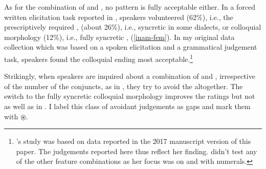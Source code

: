 \documentclass[output=paper,modfontsnewtxmath,hidelinks]{langscibook}
\begin{document}
\z

As for the combination of  and , no  pattern is fully acceptable either. In a forced written elicitation task reported in \citet{Adam:2017}, speakers volunteered   (62\%), i.e., the prescriptively required ,   (about 26\%), i.e., syncretic  in some dialects, or colloquial morphology (12\%), i.e., fully syncretic , (\ref{inam-fem}). In my original data collection which was based on a spoken elicitation and a grammatical judgement task, speakers found the colloquial ending most acceptable.\footnote{\citeauthor{Adam:2017}'s study was based on data reported in the 2017 manuscript version of this paper. The judgements reported here thus reflect her finding. \citeauthor{Adam:2017} didn't test any of the other feature combinations as her focus was on   and  with numerals.}

\z




\noindent Strikingly, when speakers are inquired about a combination of   and  , irrespective of the number of the conjuncts, as in , they try to avoid the  altogether. The switch to the fully syncretic colloquial morphology improves the ratings but not as well as in . I label this class of avoidant judgements as  gaps and mark them with $\circledast$.
\end{document}
